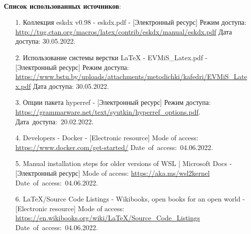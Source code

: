 \documentclass[12pt, a4paper, simple]{eskdtext}
\begin{document}
\paragraph{} \textbf{Список использованных источников}:
\begin{enumerate}
    \item[1.] Коллекция eskdx v0.98 - eskdx.pdf
    - [Электронный ресурс]
    Режим доступа: \url{http://tug.ctan.org/macros/latex/contrib/eskdx/manual/eskdx.pdf}
    Дата доступа: 30.05.2022.

    \item[2.] Использование системы верстки LaTeX - EVMiS\_Latex.pdf
    - [Электронный ресурс]
    Режим доступа: \url{https://www.bstu.by/uploads/attachments/metodichki/kafedri/EVMiS_Latex.pdf}
    Дата доступа: 30.05.2022.

    \item[3.] Опции пакета hyperref
    - [Электронный ресурс]
    Режим доступа: \url{https://grammarware.net/text/syutkin/hyperref_options.pdf}.
    Дата~доступа:~20.02.2022.

    \item[4.] Developers - Docker
    - [Electronic resource]
    Mode of access: \url{https://www.docker.com/get-started/}
    Date~of~access:~04.06.2022.

    \item[5.] Manual installation steps for older versions of WSL | Microsoft Docs
    - [Электронный ресурс]
    Mode of access: \url{https://aka.ms/wsl2kernel}
    Date~of~access:~04.06.2022.

    \item[6.] LaTeX/Source Code Listings - Wikibooks, open books for an open world
    - [Electronic resource]
    Mode of access: \url{https://en.wikibooks.org/wiki/LaTeX/Source_Code_Listings}
    Date~of~access:~04.06.2022.
\end{enumerate}

\newpage
\end{document}
